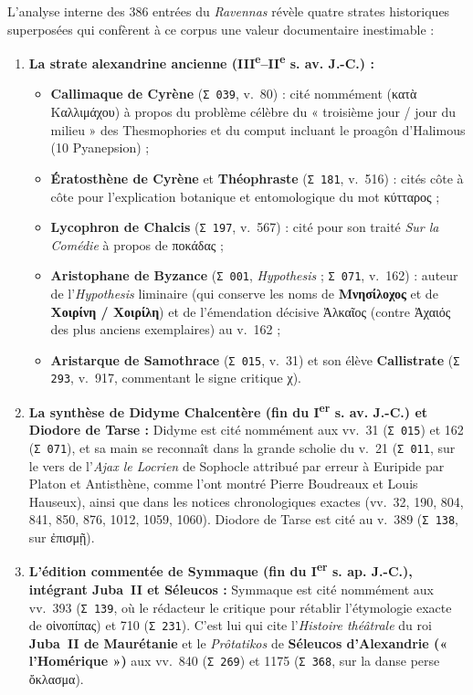 \documentclass[11pt,twoside]{book}
\providecommand{\ieme}{}\renewcommand{\ieme}{\textsuperscript{e}\xspace}
\providecommand{\ier}{}\renewcommand{\ier}{\textsuperscript{er}\xspace}
\begin{document}
{\noindent L'analyse interne des 386 entrées du \textit{Ravennas} révèle quatre strates historiques superposées qui confèrent à ce corpus une valeur documentaire inestimable :
\begin{enumerate}
  \item \textbf{La strate alexandrine ancienne (III\ieme{}–II\ieme{} s. av. J.-C.) :}
  \begin{itemize}
    \item \textbf{Callimaque de Cyrène} (\texttt{{\policeGr Σ} 039}, v.~80) : cité nommément ({\policeGr κατὰ Καλλιμάχου}) à propos du problème célèbre du « troisième jour / jour du milieu » des Thesmophories et du comput incluant le proagôn d'Halimous (10 Pyanepsion) ;
    \item \textbf{Ératosthène de Cyrène} et \textbf{Théophraste} (\texttt{{\policeGr Σ} 181}, v.~516) : cités côte à côte pour l'explication botanique et entomologique du mot {\policeGr κύτταρος} ;
    \item \textbf{Lycophron de Chalcis} (\texttt{{\policeGr Σ} 197}, v.~567) : cité pour son traité \textit{Sur la Comédie} à propos de {\policeGr ποκάδας} ;
    \item \textbf{Aristophane de Byzance} (\texttt{{\policeGr Σ} 001}, \textit{Hypothesis} ; \texttt{{\policeGr Σ} 071}, v.~162) : auteur de l'\textit{Hypothesis} liminaire (qui conserve les noms de \textbf{{\policeGr Μνησίλοχος}} et de \textbf{{\policeGr Χοιρίνη / Χοιρίλη}}) et de l'émendation décisive {\policeGr Ἀλκαῖος} (contre {\policeGr Ἀχαιός} des plus anciens exemplaires) au v.~162 ;
    \item \textbf{Aristarque de Samothrace} (\texttt{{\policeGr Σ} 015}, v.~31) et son élève \textbf{Callistrate} (\texttt{{\policeGr Σ} 293}, v.~917, commentant le signe critique {\policeGr χ}).
  \end{itemize}
  \item \textbf{La synthèse de Didyme Chalcentère (fin du I\ier{} s. av. J.-C.) et Diodore de Tarse :} Didyme est cité nommément aux vv.~31 (\texttt{{\policeGr Σ} 015}) et 162 (\texttt{{\policeGr Σ} 071}), et sa main se reconnaît dans la grande scholie du v.~21 (\texttt{{\policeGr Σ} 011}, sur le vers de l'\textit{Ajax le Locrien} de Sophocle attribué par erreur à Euripide par Platon et Antisthène, comme l'ont montré Pierre Boudreaux et Louis Hauseux), ainsi que dans les notices chronologiques exactes (vv.~32, 190, 804, 841, 850, 876, 1012, 1059, 1060). Diodore de Tarse est cité au v.~389 (\texttt{{\policeGr Σ} 138}, sur {\policeGr ἐπισμῇ}).
  \item \textbf{L'édition commentée de Symmaque (fin du I\ier{} s. ap. J.-C.), intégrant Juba~II et Séleucos :} Symmaque est cité nommément aux vv.~393 (\texttt{{\policeGr Σ} 139}, où le rédacteur le critique pour rétablir l'étymologie exacte de {\policeGr οἰνοπίπας}) et 710 (\texttt{{\policeGr Σ} 231}). C'est lui qui cite l'\textit{Histoire théâtrale} du roi \textbf{Juba~II de Maurétanie} et le \textit{Prôtatikos} de \textbf{Séleucos d'Alexandrie (« l'Homérique »)} aux vv.~840 (\texttt{{\policeGr Σ} 269}) et 1175 (\texttt{{\policeGr Σ} 368}, sur la danse perse {\policeGr ὄκλασμα}).

\end{enumerate}}
\end{document}
